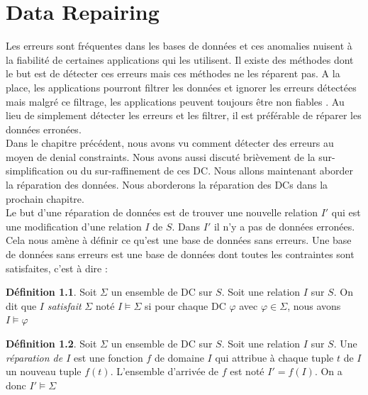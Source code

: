 \documentclass[letterpaper, 12pt]{report}
\theoremstyle{definition}
\newtheorem{mydef}{Définition}
\begin{document}

\chapter{Data Repairing}

Les erreurs sont fréquentes dans les bases de données et ces anomalies nuisent à la fiabilité de certaines applications qui les utilisent. Il existe des méthodes dont le but est de détecter ces erreurs mais ces méthodes ne les réparent pas. A la place, les applications pourront filtrer les données et ignorer les erreurs détectées mais malgré ce filtrage, les applications peuvent toujours être non fiables \cite{anodetect}. Au lieu de simplement détecter les erreurs et les filtrer, il est préférable de réparer les données erronées.\\

Dans le chapitre précédent, nous avons vu comment détecter des erreurs au moyen de denial constraints. Nous avons aussi discuté brièvement de la sur-simplification ou du sur-raffinement de ces DC. Nous allons maintenant aborder la réparation des données. Nous aborderons la réparation des DCs dans la prochain chapitre.\\

Le but d'une réparation de données est de trouver une nouvelle relation $I'$ qui est une modification d'une relation $I$ de $S$. Dans $I'$ il n'y a pas de données erronées. Cela nous amène à définir ce qu'est une base de données sans erreurs. Une base de données sans erreurs est une base de données dont toutes les contraintes sont satisfaites, c'est à dire : \\

\begin{mydef}
	Soit $\Sigma$ un ensemble de DC sur $S$. Soit une relation $I$ sur $S$. On dit que $I$ \emph{satisfait} $\Sigma$ noté $I \models \Sigma$ si pour chaque DC $\varphi$ avec $\varphi \in \Sigma$, nous avons $I \models \varphi$
\end{mydef}

\begin{mydef}
	Soit $\Sigma$ un ensemble de DC sur $S$. Soit une relation $I$ sur $S$. Une \emph{réparation de $I$} est une fonction $f$ de domaine $I$ qui attribue à chaque tuple $t$ de $I$ un nouveau tuple $f(t)$. L'ensemble d'arrivée de $f$ est noté $I'=f(I)$. On a donc $I' \models \Sigma$
\end{mydef}
\end{document}
